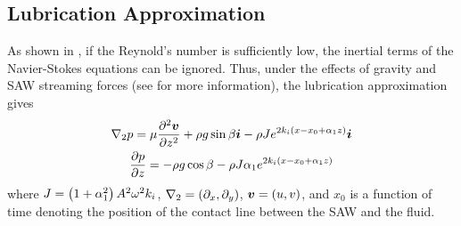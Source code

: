 
\subsection{Lubrication Approximation}
As shown in \cite{kondic2003instabilities}, if the Reynold's number is sufficiently low, the inertial terms of the Navier-Stokes equations 
can be ignored. Thus, under the effects of gravity and SAW streaming forces (see \cite{shiokawa1994saw} for more information), the lubrication approximation gives
\begin{gather}
    \nabla_2 p = \mu \frac{\partial^2 \boldsymbol{v}}{\partial z^2} + \rho g \sin\beta \boldsymbol{i} - \rho Je^{2k_i \left( x - x_0 + \alpha_1 z \right)}\boldsymbol{i}
    \label{eq:pressure_grad}\\
    \frac{\partial p}{\partial z} = -\rho g \cos\beta - \rho J\alpha_1 e^{2k_i \left( x - x_0 + \alpha_1 z \right)}
    \label{eq:pressure_z}
\end{gather}
where $J = \left( 1 + \alpha_1^2 \right)A^2\omega^2k_i$,  $\nabla_2 = \left( \partial_x, \partial_y \right)$, 
$\boldsymbol{v} = \left( u, v \right)$, and $x_0$ is a function of time denoting the position of the contact line 
between the SAW and the fluid. 

